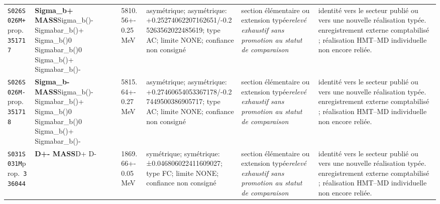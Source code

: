 \begin{landscape}
\begin{longtable}{L{1.85cm}L{4.45cm}L{2.35cm}L{4.05cm}L{3.35cm}L{7.15cm}}
\texttt{S026}\newline \texttt{S026M+}\newline prop.\ \texttt{351717} & \textbf{Sigma\_\allowbreak{}b+ MASS}\newline Sigma\_\allowbreak{}b()- \textbar{}\allowbreak{} Sigmabar\_\allowbreak{}b()+ \textbar{}\allowbreak{} Sigma\_\allowbreak{}b()0 \textbar{}\allowbreak{} Sigmabar\_\allowbreak{}b()0 \textbar{}\allowbreak{} Sigma\_\allowbreak{}b()+ \textbar{}\allowbreak{} Sigmabar\_\allowbreak{}b()- & 5810.56+-0.25\,MeV & asymétrique; asymétrique: +0.25274062207162651/-0.25263562022485619; type AC; limite NONE; confiance non consigné & section élémentaire ou extension typée\newline \emph{relevé exhaustif sans promotion au statut de comparaison} & identité vers le secteur publié ou vers une nouvelle réalisation typée. enregistrement externe comptabilisé ; réalisation HMT--MD individuelle non encore reliée. \\
\texttt{S026}\newline \texttt{S026M-}\newline prop.\ \texttt{351718} & \textbf{Sigma\_\allowbreak{}b- MASS}\newline Sigma\_\allowbreak{}b()- \textbar{}\allowbreak{} Sigmabar\_\allowbreak{}b()+ \textbar{}\allowbreak{} Sigma\_\allowbreak{}b()0 \textbar{}\allowbreak{} Sigmabar\_\allowbreak{}b()0 \textbar{}\allowbreak{} Sigma\_\allowbreak{}b()+ \textbar{}\allowbreak{} Sigmabar\_\allowbreak{}b()- & 5815.64+-0.27\,MeV & asymétrique; asymétrique: +0.27460654053367178/-0.27449500386905717; type AC; limite NONE; confiance non consigné & section élémentaire ou extension typée\newline \emph{relevé exhaustif sans promotion au statut de comparaison} & identité vers le secteur publié ou vers une nouvelle réalisation typée. enregistrement externe comptabilisé ; réalisation HMT--MD individuelle non encore reliée. \\
\texttt{S031}\newline \texttt{S031M}\newline prop.\ \texttt{336044} & \textbf{D+- MASS}\newline D+ \textbar{}\allowbreak{} D- & 1869.66+-0.05\,MeV & symétrique; symétrique: ±0.046806022411609027; type FC; limite NONE; confiance non consigné & section élémentaire ou extension typée\newline \emph{relevé exhaustif sans promotion au statut de comparaison} & identité vers le secteur publié ou vers une nouvelle réalisation typée. enregistrement externe comptabilisé ; réalisation HMT--MD individuelle non encore reliée. \\

\end{longtable}
\end{landscape}
